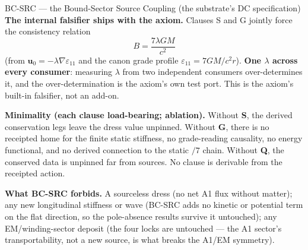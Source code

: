 \begin{resultbox}{BC-SRC — the Bound-Sector Source Coupling (the substrate's DC specification)}
\medskip\noindent\textbf{The internal falsifier ships with the axiom.} Clauses S and G jointly force the consistency relation
\begin{equation}
    B = \frac{7\lambda G M}{c^2}
    \label{eq:bcsrc_falsifier}
\end{equation}
(from $\mathbf{u}_0 = -\lambda\nabla\varepsilon_{11}$ and the canon grade profile $\varepsilon_{11} = 7GM/c^2 r$). \textbf{One $\lambda$ across every consumer}: measuring $\lambda$ from two independent consumers over-determines it, and the over-determination is the axiom's own test port. This is the axiom's built-in falsifier, not an add-on.

\medskip\noindent\textbf{Minimality (each clause load-bearing; ablation).} Without \textbf{S}, the derived conservation legs leave the dress value unpinned. Without \textbf{G}, there is no receipted home for the finite static stiffness, no grade-reading causality, no energy functional, and no derived connection to the static $/7$ chain. Without \textbf{Q}, the conserved data is unpinned far from sources. No clause is derivable from the receipted action.

\medskip\noindent\textbf{What BC-SRC forbids.} A sourceless dress (no net A1 flux without matter); any new longitudinal stiffness or wave (BC-SRC adds no kinetic or potential term on the flat direction, so the pole-absence results survive it untouched); any EM/winding-sector deposit (the four locks are untouched --- the A1 sector's transportability, not a new source, is what breaks the A1/EM symmetry).
\end{resultbox}
%
